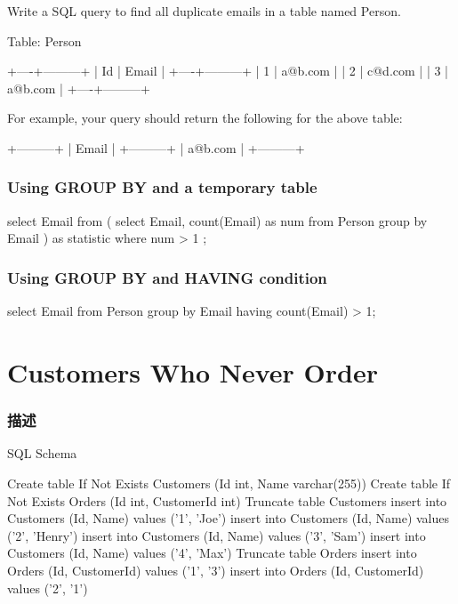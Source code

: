Write a SQL query to find all duplicate emails in a table named Person.

Table: Person
\begin{Code}
+----+---------+
| Id | Email   |
+----+---------+
| 1  | a@b.com |
| 2  | c@d.com |
| 3  | a@b.com |
+----+---------+
\end{Code}

For example, your query should return the following for the above table:

\begin{Code}
+---------+
| Email   |
+---------+
| a@b.com |
+---------+
\end{Code}


\subsubsection{Using GROUP BY and a temporary table}
\begin{Code}
select Email from
(
  select Email, count(Email) as num
  from Person
  group by Email
) as statistic
where num > 1
;
\end{Code}

\subsubsection{Using GROUP BY and HAVING condition}
\begin{Code}
select Email
from Person
group by Email
having count(Email) > 1;
\end{Code}

\section{Customers Who Never Order} %
\label{sec:customers-who-never-order}


\subsubsection{描述}
SQL Schema

\begin{Code}
Create table If Not Exists Customers (Id int, Name varchar(255))
Create table If Not Exists Orders (Id int, CustomerId int)
Truncate table Customers
insert into Customers (Id, Name) values ('1', 'Joe')
insert into Customers (Id, Name) values ('2', 'Henry')
insert into Customers (Id, Name) values ('3', 'Sam')
insert into Customers (Id, Name) values ('4', 'Max')
Truncate table Orders
insert into Orders (Id, CustomerId) values ('1', '3')
insert into Orders (Id, CustomerId) values ('2', '1')
\end{Code}

